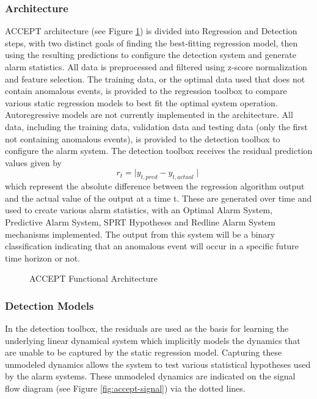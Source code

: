 \documentclass{acm_proc_article-sp}
\begin{document}
\subsubsection{Architecture}
ACCEPT architecture (see Figure \ref{fig:accept-arch}) is divided into Regression and Detection steps, with two distinct goals of finding the best-fitting regression model, then using the resulting predictions to configure the detection system and generate alarm statistics. All data is preprocessed and filtered using z-score normalization and feature selection. The training data, or the optimal data used that does not contain anomalous events, is provided to the regression toolbox to compare various static regression models to best fit the optimal system operation. Autoregressive models are not currently implemented in the architecture. All data, including the training data, validation data and testing data (only the first not containing anomalous events), is provided to the detection toolbox to configure the alarm system. The detection toolbox receives the residual prediction values given by \[r_t = \mid y_{t,pred} - y_{t,actual} \mid\] which represent the absolute difference between the regression algorithm output and the actual value of the output at a time t. These are generated over time and used to create various alarm statistics, with an Optimal Alarm System, Predictive Alarm System, SPRT Hypotheses and Redline Alarm System mechanisms implemented. The output from this system will be a binary classification indicating that an anomalous event will occur in a specific future time horizon or not.

\begin{figure}[!h]
\centering
{}
\caption{ACCEPT Functional Architecture}
\label{fig:accept-arch}
\end{figure}

\subsubsection{Detection Models}
In the detection toolbox, the residuals are used as the basis for learning the underlying linear dynamical system which implicitly models the dynamics that are unable to be captured by the static regression model. Capturing these unmodeled dynamics allows the system to test various statistical hypotheses used by the alarm systems. These unmodeled dynamics are indicated on the signal flow diagram (see Figure \ref{fig:accept-signal}) via the dotted lines.
\end{document}

